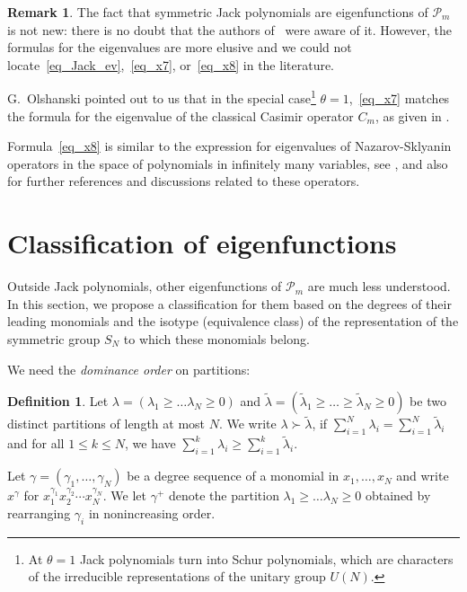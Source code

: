 \documentclass[11pt]{article}
\theoremstyle{definition}
\newtheorem{defi}[theo]{Definition}
\newtheorem{rema}[theo]{Remark}
\numberwithin{equation}{section}
\newcommand{\PP}{\mathcal P}
\begin{document}
\begin{rema}
 The fact that symmetric Jack polynomials are eigenfunctions of $\PP_m$ is not new: there is no doubt that the authors of~\cite{heckman1991elementary,polychronakos1992exchange,lapointe1996exact} were aware of it. However, the formulas for the eigenvalues are more elusive and we could not locate~\eqref{eq_Jack_ev},~\eqref{eq_x7}, or~\eqref{eq_x8} in the literature.

 G.~Olshanski pointed out to us that in the special case\footnote{At $\theta=1$ Jack polynomials turn into Schur polynomials, which are characters of the irreducible representations of the unitary group $U(N)$.} $\theta=1$,~\eqref{eq_x7} matches the formula for the eigenvalue of the classical Casimir operator $C_m$, as given in \cite[(*) and Theorem 2 in Section 60]{zhelobenko1973compact}.

  Formula~\eqref{eq_x8} is similar to the expression for eigenvalues of Nazarov-Sklyanin operators in the space of polynomials in infinitely many variables, see \cite[Section 6]{nazarov2013integrable}, and also~\cite{mickler2023spectral} for further references and discussions related to these operators.
\end{rema}

\section{Classification of eigenfunctions}

\label{Section_classification}

Outside Jack polynomials, other eigenfunctions of $\PP_m$ are much less understood. In this section, we propose a classification for them based on the degrees of their leading monomials and the isotype (equivalence class) of the representation of the symmetric group $S_N$ to which these monomials belong.


We need the  \emph{dominance order} on partitions:
\begin{defi}
 Let $\lambda=(\lambda_1\ge\dots\lambda_N\ge 0)$ and $\tilde \lambda=(\tilde \lambda_1\ge \dots\ge \tilde \lambda_N\ge 0)$ be two distinct partitions of length at most $N$. We write $\lambda\succ \tilde \lambda$, if  $\sum_{i=1}^N\lambda_i = \sum_{i=1}^N \tilde \lambda_i$ and for
  all $1\le k \le N$, we have $\sum_{i=1}^k \lambda_i \ge \sum_{i=1}^k \tilde \lambda_i$.
\end{defi}

Let $\gamma=(\gamma_1,\dots,\gamma_N)$ be a degree sequence of a monomial in $x_1,\dots,x_N$ and write $x^{\gamma}$ for $x_1^{\gamma_1} x_2^{\gamma_2}\cdots x_N^{\gamma_N}$. We let $\gamma^+$ denote the partition $\lambda_1\ge\dots\lambda_N\ge 0$ obtained by rearranging $\gamma_i$ in nonincreasing order.
\end{document}
